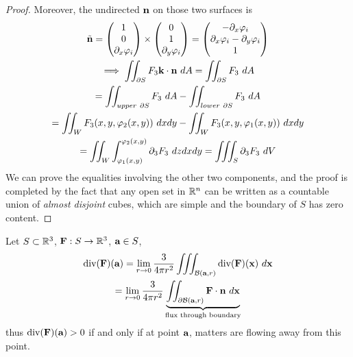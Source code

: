 \documentclass[11pt]{article}
\begin{document}
\begin{theorem}
\begin{proof}[Proof]
				 Moreover, the undirected $\textbf{n}$ on those two surfaces is
				 \begin{gather}
				 	\tilde{\ve{n}} = \begin{pmatrix} 1 \\ 0 \\ \partial_x \varphi_i \end{pmatrix} \times \begin{pmatrix} 0 \\ 1 \\ \partial_y \varphi_i \end{pmatrix} = \begin{pmatrix} - \partial_x \varphi_i \\ \partial_x \varphi_i - \partial_y \varphi_i \\ 1 \end{pmatrix} \\
				 	\implies \iint_{\partial S} F_3 \ve{k} \cdot \ve{n}\ dA = \iint_{\partial S} F_3\ dA \\
				 	= \iint_{upper\ \partial S} F_3\ dA - \iint_{lower\ \partial S} F_3\ dA \\
				 	= \iint_{W} F_3 (x, y, \varphi_2(x, y))\ dx dy -  \iint_{W} F_3 (x, y, \varphi_1(x, y))\ dx dy \\
				 	= \iint_W \int_{\varphi_1(x, y)}^{\varphi_2(x, y)} \partial_3 F_3\ dz dx dy 
				 	= \iiint_S \partial_3 F_3 \ dV
				 \end{gather}
				 We can prove the equalities involving the other two components, and the proof is completed by the fact that any open set in $\mathbb{R}^n$ can be written as a countable union of \emph{almost disjoint} cubes, which are simple and the boundary of $S$ has zero content.
				\end{proof}
			\end{theorem}
			
			\begin{proposition}
				Let $S \subset \mathbb{R}^3$, $\textbf{F}: S \to \mathbb{R}^3$, $\textbf{a} \in S$, 
				\begin{gather}
					\dive(\ve{F})(\ve{a}) = \lim_{r \to 0} \frac{3}{4 \pi r^2} \iiint_{\mc{B}(\ve{a}, r)} \dive(\ve{F})(\ve{x})\ d\ve{x} \\
					= \lim_{r \to 0} \frac{3}{4 \pi r^2} \underbrace{\iint_{\partial \mc{B}(\ve{a}, r)} \ve{F} \cdot \ve{n}\ d\ve{x}}_{\tx{flux through boundary}}
				\end{gather}
				thus $\text{div}(\textbf{F})(\textbf{a}) > 0$ if and only if at point $\textbf{a}$, matters are flowing away from this point.
			\end{proposition}
			
\end{document}
